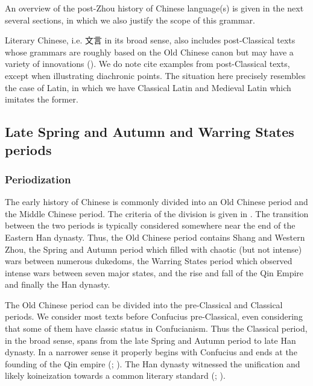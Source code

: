 \documentclass[UTF8, a4paper, oneside, scheme=plain, 12pt]{ctexrep}
\newcommand*{\citepage}[1]{p.~{#1}}
\newcommand*{\citepages}[1]{pp.~{#1}}
\begin{document}
An overview of the post-Zhou history of Chinese language(s) is given in the next several sections,
in which we also justify the scope of this grammar.

Literary Chinese, i.e. 文言 in its broad sense,
also includes post-Classical texts whose grammars are roughly based on the Old Chinese canon
but may have a variety of innovations ().
We do note cite examples from post-Classical texts, except when illustrating diachronic points.
The situation here precisely resembles the case of Latin,
in which we have Classical Latin and Medieval Latin which imitates the former.

\subsection{Late Spring and Autumn and Warring States periods}\label{sec:intro.sprint-and-autumn}

\subsubsection{Periodization}

The early history of Chinese is commonly divided into 
an Old Chinese period and the Middle Chinese period.
The criteria of the division is given in .
The transition between the two periods is typically considered somewhere near the end of the Eastern Han dynasty.
Thus, the Old Chinese period contains Shang and Western Zhou, 
the Spring and Autumn period which filled with chaotic (but not intense) wars between numerous dukedoms,
the Warring States period which observed intense wars between seven major states, and the rise and fall of the Qin Empire and finally the Han dynasty.

The Old Chinese period can be divided into the pre-Classical and Classical periods.
We consider most texts before Confucius pre-Classical,
even considering that some of them have classic status in Confucianism.
Thus the Classical period, in the broad sense, spans from the late Spring and Autumn period
to late Han dynasty.
In a narrower sense it properly begins with Confucius and ends at the founding of the Qin empire (\citealt[\citepage{3}]{pulleyblank1995outline}; ).
The Han dynasty witnessed the unification and likely koineization towards a common literary standard (\citealt[\citepages{3-4}]{pulleyblank1995outline}; ).
\end{document}
